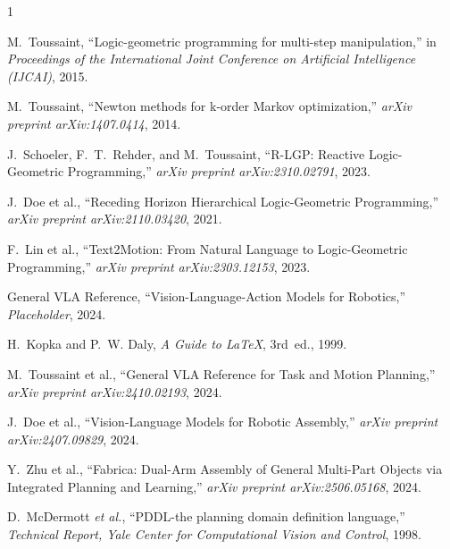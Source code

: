 \documentclass[journal]{IEEEtran}
\begin{document}
  \begin{thebibliography}{1}

     M.~Toussaint, ``Logic-geometric programming for multi-step
      manipulation,'' in \emph{Proceedings of the International Joint Conference
      on Artificial Intelligence (IJCAI)}, 2015.

     M.~Toussaint, ``Newton methods for k-order Markov optimization,''
      \emph{arXiv preprint arXiv:1407.0414}, 2014.


     J.~Schoeler, F.~T.~Rehder, and M.~Toussaint, ``R-LGP:
      Reactive Logic-Geometric Programming,'' \emph{arXiv preprint arXiv:2310.02791},
      2023.

     J.~Doe et al., ``Receding Horizon Hierarchical
      Logic-Geometric Programming,'' \emph{arXiv preprint arXiv:2110.03420}, 2021.

     F.~Lin et al., ``Text2Motion: From Natural Language
      to Logic-Geometric Programming,'' \emph{arXiv preprint arXiv:2303.12153},
      2023.

     General VLA Reference, ``Vision-Language-Action
      Models for Robotics,'' \emph{Placeholder}, 2024.

     H.~Kopka and P.~W. Daly, \emph{A Guide to \LaTeX},
      3rd~ed., 1999.

     M.~Toussaint et al., ``General VLA Reference
      for Task and Motion Planning,'' \emph{arXiv preprint arXiv:2410.02193}, 2024.

     J.~Doe et al., ``Vision-Language Models for
      Robotic Assembly,'' \emph{arXiv preprint arXiv:2407.09829}, 2024.

     Y.~Zhu et al., ``Fabrica: Dual-Arm Assembly of
      General Multi-Part Objects via Integrated Planning and Learning,'' \emph{arXiv
      preprint arXiv:2506.05168}, 2024.


     D.~McDermott \emph{et al.}, ``PDDL-the planning
      domain definition language,'' \emph{Technical Report, Yale Center for Computational
      Vision and Control}, 1998.
  \end{thebibliography}
\end{document}
